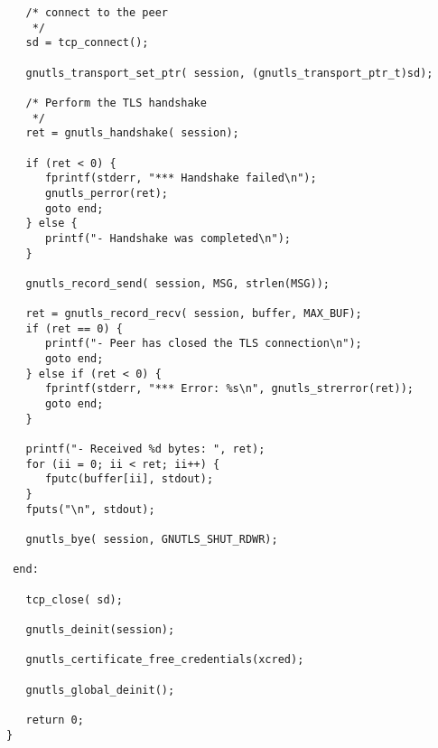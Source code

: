 \begin{verbatim}
   /* connect to the peer
    */
   sd = tcp_connect();

   gnutls_transport_set_ptr( session, (gnutls_transport_ptr_t)sd);

   /* Perform the TLS handshake
    */
   ret = gnutls_handshake( session);

   if (ret < 0) {
      fprintf(stderr, "*** Handshake failed\n");
      gnutls_perror(ret);
      goto end;
   } else {
      printf("- Handshake was completed\n");
   }

   gnutls_record_send( session, MSG, strlen(MSG));

   ret = gnutls_record_recv( session, buffer, MAX_BUF);
   if (ret == 0) {
      printf("- Peer has closed the TLS connection\n");
      goto end;
   } else if (ret < 0) {
      fprintf(stderr, "*** Error: %s\n", gnutls_strerror(ret));
      goto end;
   }

   printf("- Received %d bytes: ", ret);
   for (ii = 0; ii < ret; ii++) {
      fputc(buffer[ii], stdout);
   }
   fputs("\n", stdout);

   gnutls_bye( session, GNUTLS_SHUT_RDWR);

 end:

   tcp_close( sd);

   gnutls_deinit(session);

   gnutls_certificate_free_credentials(xcred);

   gnutls_global_deinit();

   return 0;
}

\end{verbatim}
